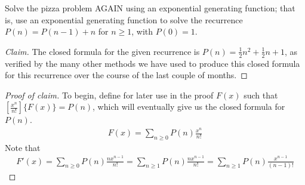 \documentclass[12pt]{article}
\newenvironment{problem}[2][Problem]{\begin{trivlist}
\item[\hskip \labelsep {\bfseries #1}\hskip \labelsep {\bfseries #2.}]}{\end{trivlist}}
\begin{document}
\begin{problem}{3}
Solve the pizza problem AGAIN using an exponential generating function; that is, use an exponential generating function to solve the recurrence $P(n)=P(n-1)+n$ for $n \geq 1$, with $P(0)=1$.
\end{problem}
 
\begin{proof}[Claim]
The closed formula for the given recurrence is $P(n)=\frac{1}{2}n^2+\frac{1}{2}n+1$, as verified by the many other methods we have used to produce this closed formula for this recurrence over the course of the last couple of months.
\end{proof}

\begin{proof}[Proof of claim]
To begin, define for later use in the proof $F(x)$ such that $[\frac{x^n}{n!}]\{F(x)\}=P(n)$, which will eventually give us the closed formula for $P(n)$.
\begin{eqnarray}
F(x)=\sum_{n\geq0}P(n)\frac{x^n}{n!}
\end{eqnarray}
Note that
\begin{eqnarray}
F'(x)=\sum_{n \geq 0}P(n)\frac{nx^{n-1}}{n!}=\sum_{n \geq 1}P(n)\frac{nx^{n-1}}{n!}=\sum_{n \geq 1}P(n)\frac{x^{n-1}}{(n-1)!}
\end{eqnarray}


\end{proof}
\end{document}
